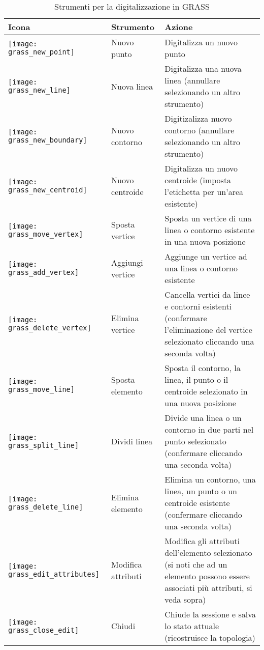 \begin{table}[h]
\centering
\caption{Strumenti per la digitalizzazione in GRASS}\label{tab:grass_tools}\medskip
 \begin{tabular}{|l|l|p{5in}|}
 \hline \textbf{Icona} & \textbf{Strumento} & \textbf{Azione} \\
\hline \texttt{[image: grass\_new\_point]} & Nuovo punto &
Digitalizza un nuovo punto \\
\hline \texttt{[image: grass\_new\_line]} & Nuova linea &
Digitalizza una nuova linea (annullare selezionando un altro strumento) \\
\hline \texttt{[image: grass\_new\_boundary]} & Nuovo contorno &
Digitizalizza nuovo contorno (annullare selezionando un altro strumento)\\
\hline \texttt{[image: grass\_new\_centroid]} & Nuovo centroide &
Digitalizza un nuovo centroide (imposta l'etichetta per un'area esistente)\\
\hline \texttt{[image: grass\_move\_vertex]} & Sposta vertice &
Sposta un vertice di una linea o contorno esistente in una nuova posizione\\
\hline \texttt{[image: grass\_add\_vertex]} & Aggiungi vertice &
Aggiunge un vertice ad una linea o contorno esistente\\
\hline \texttt{[image: grass\_delete\_vertex]} & Elimina vertice &
Cancella vertici da linee e contorni esistenti (confermare l'eliminazione del
vertice selezionato cliccando una seconda volta)\\
\hline \texttt{[image: grass\_move\_line]} & Sposta elemento &
Sposta il contorno, la linea, il punto o il centroide selezionato in una nuova
posizione\\
\hline \texttt{[image: grass\_split\_line]} & Dividi linea & Divide
una linea o un contorno in due parti nel punto selezionato (confermare
cliccando una seconda volta)\\
\hline \texttt{[image: grass\_delete\_line]} & Elimina elemento &
Elimina un contorno, una linea, un punto o un centroide esistente (confermare
cliccando una seconda volta)\\
\hline \texttt{[image: grass\_edit\_attributes]} & Modifica
attributi & Modifica gli attributi dell'elemento selezionato (si noti che ad un
elemento possono essere associati più attributi, si veda sopra)\\
\hline \texttt{[image: grass\_close\_edit]} & Chiudi & Chiude la
sessione e salva lo stato attuale (ricostruisce la topologia)\\
\hline
\end{tabular}
\end{table}

